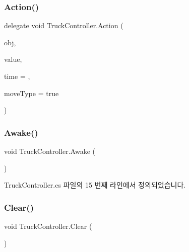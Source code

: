 \subsubsection{\texorpdfstring{Action()}{Action()}}
{\footnotesize\ttfamily delegate void Truck\+Controller.\+Action (\begin{DoxyParamCaption}\item[{Game\+Object}]{obj,  }\item[{float}]{value,  }\item[{float}]{time = {},  }\item[{bool}]{move\+Type = {\ttfamily true} }\end{DoxyParamCaption})}

\mbox{\label{class_truck_controller_ae262698bc9cadb7e91b85b9126913554}} 
\subsubsection{\texorpdfstring{Awake()}{Awake()}}
{\footnotesize\ttfamily void Truck\+Controller.\+Awake (\begin{DoxyParamCaption}{ }\end{DoxyParamCaption})\hspace{0.3cm}{\ttfamily [private]}}



Truck\+Controller.\+cs 파일의 15 번째 라인에서 정의되었습니다.


\begin{DoxyCode}{0}

\end{DoxyCode}
\mbox{\label{class_truck_controller_af325273a29ea814c8401d5d4372f577f}} 
\subsubsection{\texorpdfstring{Clear()}{Clear()}}
{\footnotesize\ttfamily void Truck\+Controller.\+Clear (\begin{DoxyParamCaption}{ }\end{DoxyParamCaption})}




